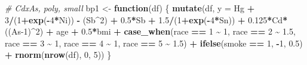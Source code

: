 \documentclass[12pt, twoside]{amherstthesis}
\newenvironment{Shaded}{\begin{snugshade}}{\end{snugshade}}
\newcommand{\AttributeTok}[1]{\textcolor[rgb]{0.13,0.29,0.53}{#1}}
\newcommand{\CommentTok}[1]{\textcolor[rgb]{0.56,0.35,0.01}{\textit{#1}}}
\newcommand{\ControlFlowTok}[1]{\textcolor[rgb]{0.13,0.29,0.53}{\textbf{#1}}}
\newcommand{\DecValTok}[1]{\textcolor[rgb]{0.00,0.00,0.81}{#1}}
\newcommand{\FloatTok}[1]{\textcolor[rgb]{0.00,0.00,0.81}{#1}}
\newcommand{\FunctionTok}[1]{\textcolor[rgb]{0.13,0.29,0.53}{\textbf{#1}}}
\newcommand{\NormalTok}[1]{#1}
\newcommand{\OtherTok}[1]{\textcolor[rgb]{0.56,0.35,0.01}{#1}}
\newcommand{\SpecialCharTok}[1]{\textcolor[rgb]{0.81,0.36,0.00}{\textbf{#1}}}
\begin{document}
\begin{Shaded}
\begin{Highlighting}[]
\CommentTok{\# CdxAs, poly, small}
\NormalTok{bp1 }\OtherTok{\textless{}{-}} \ControlFlowTok{function}\NormalTok{(df) \{}
  \FunctionTok{mutate}\NormalTok{(df, }\AttributeTok{y =} 
\NormalTok{           Hg }\SpecialCharTok{+} \DecValTok{3}\SpecialCharTok{/}\NormalTok{(}\DecValTok{1}\SpecialCharTok{+}\FunctionTok{exp}\NormalTok{(}\SpecialCharTok{{-}}\DecValTok{4}\SpecialCharTok{*}\NormalTok{Ni)) }\SpecialCharTok{{-}}\NormalTok{ (Sb}\SpecialCharTok{\^{}}\DecValTok{2}\NormalTok{) }\SpecialCharTok{+} \FloatTok{0.5}\SpecialCharTok{*}\NormalTok{Sb }\SpecialCharTok{+} \FloatTok{1.5}\SpecialCharTok{/}\NormalTok{(}\DecValTok{1}\SpecialCharTok{+}\FunctionTok{exp}\NormalTok{(}\SpecialCharTok{{-}}\DecValTok{4}\SpecialCharTok{*}\NormalTok{Sn)) }\SpecialCharTok{+} 
           \FloatTok{0.125}\SpecialCharTok{*}\NormalTok{Cd}\SpecialCharTok{*}\NormalTok{((As}\DecValTok{{-}1}\NormalTok{)}\SpecialCharTok{\^{}}\DecValTok{2}\NormalTok{) }\SpecialCharTok{+}
\NormalTok{           age }\SpecialCharTok{+} \FloatTok{0.5}\SpecialCharTok{*}\NormalTok{bmi }\SpecialCharTok{+} 
           \FunctionTok{case\_when}\NormalTok{(race }\SpecialCharTok{==} \DecValTok{1} \SpecialCharTok{\textasciitilde{}} \DecValTok{1}\NormalTok{, }
\NormalTok{                     race }\SpecialCharTok{==} \DecValTok{2} \SpecialCharTok{\textasciitilde{}} \FloatTok{1.5}\NormalTok{, }
\NormalTok{                     race }\SpecialCharTok{==} \DecValTok{3} \SpecialCharTok{\textasciitilde{}} \DecValTok{1}\NormalTok{, }
\NormalTok{                     race }\SpecialCharTok{==} \DecValTok{4} \SpecialCharTok{\textasciitilde{}} \DecValTok{1}\NormalTok{, }
\NormalTok{                     race }\SpecialCharTok{==} \DecValTok{5} \SpecialCharTok{\textasciitilde{}} \FloatTok{1.5}\NormalTok{) }\SpecialCharTok{+}
           \FunctionTok{ifelse}\NormalTok{(smoke }\SpecialCharTok{==} \DecValTok{1}\NormalTok{, }\SpecialCharTok{{-}}\DecValTok{1}\NormalTok{, }\FloatTok{0.5}\NormalTok{) }\SpecialCharTok{+}
           \FunctionTok{rnorm}\NormalTok{(}\FunctionTok{nrow}\NormalTok{(df), }\DecValTok{0}\NormalTok{, }\DecValTok{5}\NormalTok{))}
\NormalTok{\}}


\end{Highlighting}
\end{Shaded}
\end{document}
